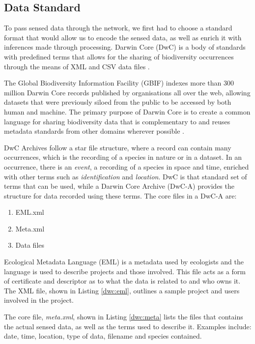 	\subsection{Data Standard}\label{arch:tech:dwc}
		To pass sensed data through the network, we first had to choose a standard format that would allow us to encode the sensed data, as well as enrich it with inferences made through processing. Darwin Core (DwC) is a body of standards with predefined terms that allows for the sharing of biodiversity occurrences through the means of XML and CSV data files \cite{Wieczorek2012b}.

The Global Biodiversity Information Facility (GBIF) indexes more than 300 million Darwin Core records published by organisations all over the web, allowing datasets that were previously siloed from the public to be accessed by both human and machine. The primary purpose of Darwin Core is to create a common language for sharing biodiversity data that is complementary to and reuses metadata standards from other domains wherever possible \cite{Wieczorek2012a}.

DwC Archives follow a star file structure, where a record can contain many occurrences, which is the recording of a species in nature or in a dataset. In an occurrence, there is an \textit{event}, a recording of a species in space and time, enriched with other terms such as \textit{identification} and \textit{location}. DwC is that standard set of terms that can be used, while a Darwin Core Archive (DwC-A) provides the structure for data recorded using these terms. The core files in a DwC-A are:
\begin{enumerate}
	\item EML.xml
	\item Meta.xml
	\item Data files
\end{enumerate}

Ecological Metadata Language (EML) is a metadata used by ecologists and the language is used to describe projects and those involved. This file acts as a form of certificate and descriptor as to what the data is related to and who owns it. The XML file, shown in Listing \ref{dwc:eml}, outlines a sample project and users involved in the project.



The core file, \textit{meta.xml}, shown in Listing \ref{dwc:meta} lists the files that contains the actual sensed data, as well as the terms used to describe it. Examples include: date, time, location, type of data, filename and species contained.

